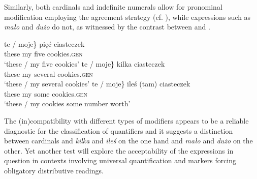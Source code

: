 \documentclass[output=paper,
]{langscibook}
\begin{document}
	\ea \label{ex:adjectival-modifiers-agreement-malo} 
	\z
    \z

\largerpage[2]
	\noindent Similarly, both cardinals and indefinite numerals allow for pronominal modification employing the agreement strategy (cf. \citealt{miechowicz-mathiasen2011syntax}), while expressions such as \textit{mało} and \textit{dużo} do not, as witnessed by the contrast between  and .
	
	\ea \label{ex:pronominal-modifiers-cardinals} \ea \gll \minsp{\{} te / moje\} pięć ciasteczek\\
	{} these {} my five cookies.\textsc{gen}\\
	\glt `these / my five cookies'
	\ex \gll \minsp{\{} te / moje\} kilka ciasteczek\\
	{} these {} my several cookies.\textsc{gen}\\
	\glt `these / my several cookies'
	\ex \gll \minsp{\{} te / moje\} {ileś (tam)} ciasteczek\\
	{} these {} my some cookies.\textsc{gen}\\
	\glt `these / my cookies some number worth'
	\z
    \z

	\ea \label{ex:pronominal-modifiers-malo} 
	\z
    \z

	\noindent The (in)compatibility with different types of modifiers appears to be a reliable diagnostic for the classification of quantifiers and it suggests a distinction between cardinals and \textit{kilka} and \textit{ileś} on the one hand and \textit{mało} and \textit{dużo} on the other. Yet another test will explore the acceptability of the expressions in question in contexts involving universal quantification and markers forcing obligatory distributive readings.
	
\end{document}
